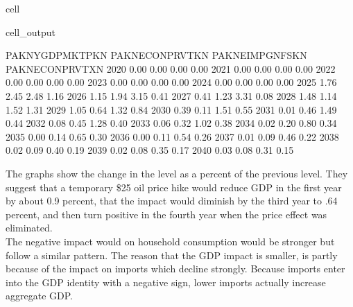 \documentclass[letterpaper,10pt,english]{jupyterBook}
\begin{document}
\begin{sphinxuseclass}{cell}
\begin{sphinxVerbatimOutput}
\begin{sphinxuseclass}{cell_output}
\begin{sphinxVerbatim}[commandchars=\\\{\}]
      PAKNYGDPMKTPKN  PAKNECONPRVTKN  PAKNEIMPGNFSKN  PAKNECONPRVTXN
2020            0.00            0.00            0.00            0.00
2021           \PYGZhy{}0.00           \PYGZhy{}0.00           \PYGZhy{}0.00            0.00
2022           \PYGZhy{}0.00            0.00            0.00            0.00
2023            0.00            0.00            0.00            0.00
2024            0.00            0.00            0.00            0.00
2025           \PYGZhy{}1.76           \PYGZhy{}2.45           \PYGZhy{}2.48            1.16
2026           \PYGZhy{}1.15           \PYGZhy{}1.94           \PYGZhy{}3.15            0.41
2027           \PYGZhy{}0.41           \PYGZhy{}1.23           \PYGZhy{}3.31           \PYGZhy{}0.08
2028            1.48            1.14           \PYGZhy{}1.52           \PYGZhy{}1.31
2029            1.05            0.64           \PYGZhy{}1.32           \PYGZhy{}0.84
2030            0.39           \PYGZhy{}0.11           \PYGZhy{}1.51           \PYGZhy{}0.55
2031            0.01           \PYGZhy{}0.46           \PYGZhy{}1.49           \PYGZhy{}0.44
2032           \PYGZhy{}0.08           \PYGZhy{}0.45           \PYGZhy{}1.28           \PYGZhy{}0.40
2033           \PYGZhy{}0.06           \PYGZhy{}0.32           \PYGZhy{}1.02           \PYGZhy{}0.38
2034           \PYGZhy{}0.02           \PYGZhy{}0.20           \PYGZhy{}0.80           \PYGZhy{}0.34
2035           \PYGZhy{}0.00           \PYGZhy{}0.14           \PYGZhy{}0.65           \PYGZhy{}0.30
2036           \PYGZhy{}0.00           \PYGZhy{}0.11           \PYGZhy{}0.54           \PYGZhy{}0.26
2037           \PYGZhy{}0.01           \PYGZhy{}0.09           \PYGZhy{}0.46           \PYGZhy{}0.22
2038           \PYGZhy{}0.02           \PYGZhy{}0.09           \PYGZhy{}0.40           \PYGZhy{}0.19
2039           \PYGZhy{}0.02           \PYGZhy{}0.08           \PYGZhy{}0.35           \PYGZhy{}0.17
2040           \PYGZhy{}0.03           \PYGZhy{}0.08           \PYGZhy{}0.31           \PYGZhy{}0.15
\end{sphinxVerbatim}

\end{sphinxuseclass}\end{sphinxVerbatimOutput}

\end{sphinxuseclass}
\sphinxAtStartPar
The graphs show the change in the level as a percent of the previous level. They suggest that a temporary \$25 oil price hike would reduce GDP in the first year by about 0.9 percent, that the impact would diminish by the third year to \sphinxhyphen{}.64 percent, and then turn positive in the fourth year when the price effect was eliminated.\\
The negative impact would on household consumption would be stronger but follow a similar pattern.  The reason that the GDP impact is smaller, is partly because of the impact on imports which decline strongly.  Because imports enter into the GDP identity with a negative sign, lower imports actually increase aggregate GDP.
\end{document}
